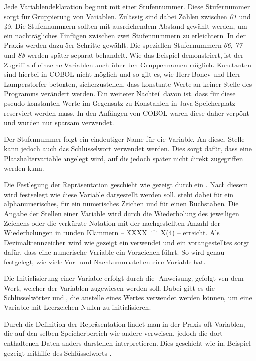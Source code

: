 Jede Variablendeklaration beginnt mit einer Stufennummer. Diese Stufennummer sorgt für Gruppierung von Variablen. Zulässig sind dabei Zahlen zwischen \textit{01} und \textit{49}. Die Stufennummern sollten mit ausreichendem Abstand gewählt werden, um ein nachträgliches Einfügen zwischen zwei Stufennummern zu erleichtern. In der Praxis werden dazu \idR 5er-Schritte gewählt. Die speziellen Stufennummern \textit{66}, \textit{77} und \textit{88} werden später separat behandelt. Wie das Beispiel demonstriert, ist der Zugriff auf einzelne Variablen auch über den Gruppennamen möglich. Konstanten sind hierbei in COBOL nicht möglich und so gilt es, wie Herr Bonev und Herr Lamperstorfer betonten, sicherzustellen, dass konstante Werte an keiner Stelle des Programms verändert werden. Ein weiterer Nachteil davon ist, dass für diese pseudo-konstanten Werte im Gegensatz zu Konstanten in Java Speicherplatz reserviert werden muss. In den Anfängen von COBOL waren diese daher  verpönt und wurden nur sparsam verwendet.

Der Stufennummer folgt ein eindeutiger Name für die Variable. An dieser Stelle kann jedoch auch das Schlüsselwort  verwendet werden. Dies sorgt dafür, dass eine Platzhaltervariable angelegt wird, auf die jedoch später nicht direkt zugegriffen werden kann.

Die Festlegung der Repräsentation geschieht wie gezeigt durch ein . Nach diesem  wird festgelegt wie diese Variable dargestellt werden soll.  steht dabei für ein alphanumerisches,  für ein numerisches Zeichen und  für einen Buchstaben. Die Angabe der Stellen einer Variable wird durch die Wiederholung des jeweiligen Zeichens oder die verkürzte Notation mit der nachgestellten Anzahl der Wiederholungen in runden Klammern -- \zB XXXX $\widehat{=}$ X(4) -- erreicht. Als Dezimaltrennzeichen wird wie gezeigt ein  verwendet und ein vorangestelltes  sorgt dafür, dass eine numerische Variable ein Vorzeichen führt. So wird genau festgelegt, wie viele Vor- und Nachkommastellen eine Variable hat.

Die Initialisierung einer Variable erfolgt durch die -Anweisung, gefolgt von dem Wert, welcher der Variablen zugewiesen werden soll. Dabei gibt es die Schlüsselwörter  \bzw {} und  \bzw {}, die anstelle eines Wertes verwendet werden können, um eine Variable mit Leerzeichen \bzw Nullen zu initialisieren.

Durch die Definition der Repräsentation findet man in der Praxis oft Variablen, die auf den selben Speicherbereich wie andere verweisen, jedoch die dort enthaltenen Daten anders darstellen \bzw interpretieren. Dies geschieht wie im Beispiel gezeigt mithilfe des Schlüsselworts .

